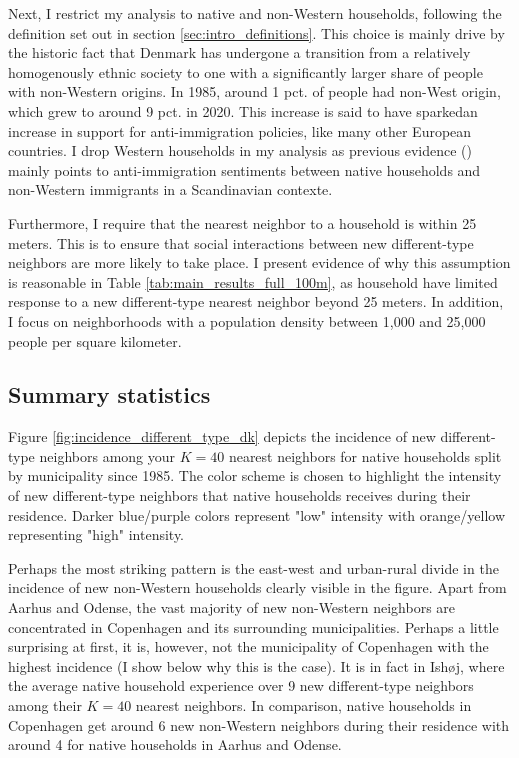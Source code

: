 \documentclass[main.tex]{subfiles}
\begin{document}
Next, I restrict my analysis to native and non-Western households, following the definition set out in section \ref{sec:intro_definitions}. This choice is mainly drive by the historic fact that Denmark has undergone a transition from a relatively homogenously ethnic society to one with a significantly larger share of people with non-Western origins. In 1985, around 1 pct. of people had non-West origin, which grew to around 9 pct. in 2020. This increase is said to have sparkedan increase in support for anti-immigration policies, like many other European countries. I drop Western households in my analysis as previous evidence (\textcite{bohlmark_willen_2020_tipping, legrand_2002_immigrant_discontent, rockwool_boje2024immigrants}) mainly points to anti-immigration sentiments between native households and non-Western immigrants in a Scandinavian contexte.

Furthermore, I require that the nearest neighbor to a household is within 25 meters. This is to ensure that social interactions between new different-type neighbors are more likely to take place. I present evidence of why this assumption is reasonable in Table \ref{tab:main_results_full_100m}, as household have limited response to a new different-type nearest neighbor beyond 25 meters. In addition, I focus on neighborhoods with a population density between 1,000 and 25,000 people per square kilometer. 

\newpage
\subsection{Summary statistics}
Figure \ref{fig:incidence_different_type_dk} depicts the incidence of new different-type neighbors among your $K=40$ nearest neighbors for native households split by municipality since 1985. The color scheme is chosen to highlight the intensity of new different-type neighbors that native households receives during their residence. Darker blue/purple colors represent "low" intensity with orange/yellow representing "high" intensity.

Perhaps the most striking pattern is the east-west and urban-rural divide in the incidence of new non-Western households clearly visible in the figure. Apart from Aarhus and Odense, the vast majority of new non-Western neighbors are concentrated in Copenhagen and its surrounding municipalities. Perhaps a little surprising at first, it is, however, not the municipality of Copenhagen with the highest incidence (I show below why this is the case). It is in fact in Ishøj, where the average native household experience over 9 new different-type neighbors among their $K=40$ nearest neighbors. In comparison, native households in Copenhagen get around 6 new non-Western neighbors during their residence with around 4 for native households in Aarhus and Odense. 
\end{document}
